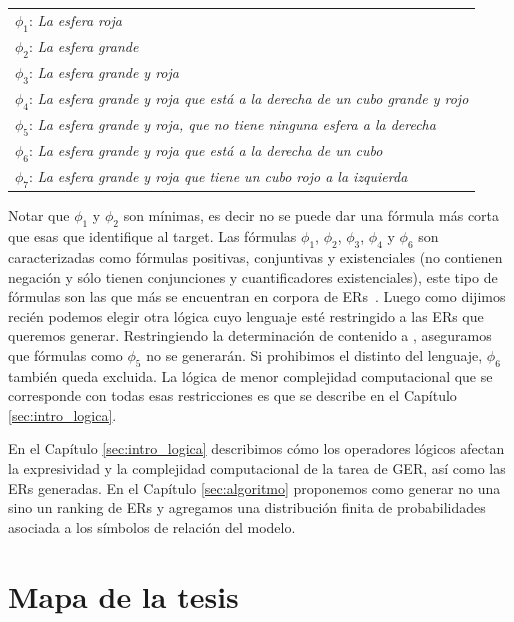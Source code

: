 \begin{tabular}{l}
 $\phi_1$: {\it La esfera roja}\\[1pt]
 $\phi_2$: {\it La esfera grande}\\[1pt]
 $\phi_3$: {\it La esfera grande y roja}\\[1pt]
 $\phi_4$: {\it La esfera grande y roja que est\'a a la derecha de un cubo grande y rojo}\\[1pt]
 $\phi_5$: {\it La esfera grande y roja, que no tiene ninguna esfera a la derecha}\\[1pt]
 $\phi_6$: {\it La esfera grande y roja que est\'a a la derecha de un cubo}\\[1pt]
 $\phi_7$: {\it La esfera grande y roja que tiene un cubo rojo a la izquierda}\\[1pt]
\end{tabular}
\smallskip

Notar que $\phi_1$ y $\phi_2$ son m\'inimas, es decir no se puede dar una f\'ormula m\'as corta que esas que identifique al target.
Las f\'ormulas $\phi_1$, $\phi_2$, $\phi_3$, $\phi_4$ y $\phi_6$ son caracterizadas como f\'ormulas positivas, conjuntivas y existenciales (no contienen negaci\'on y s\'olo tienen conjunciones y cuantificadores existenciales), este tipo de f\'ormulas son las que m\'as se encuentran en corpora de ERs~\cite{viethen06:_algor_for_gener_refer_expres,deemter06:_build_seman_trans_corpus_for,gre3d3}. Luego como dijimos reci\'en podemos elegir otra l\'ogica cuyo lenguaje est\'e restringido a las ERs que queremos generar. Restringiendo la determinaci\'on de contenido a \EPFOL, aseguramos que f\'ormulas como  $\phi_5$ no se generar\'an. Si prohibimos el distinto del lenguaje, $\phi_6$ tambi\'en queda excluida. La l\'ogica de menor complejidad computacional que se corresponde con todas esas restricciones es \EL que se describe en el Cap\'itulo \ref{sec:intro_logica}. 

En el Cap\'itulo \ref{sec:intro_logica} describimos c\'omo los operadores l\'ogicos afectan la expresividad y la complejidad computacional de la tarea de GER, as\'i como las ERs generadas. En el Cap\'itulo \ref{sec:algoritmo} proponemos como generar no una sino un ranking de ERs y agregamos una distribuci\'on finita de probabilidades asociada a los s\'imbolos de relaci\'on del modelo.



\section{Mapa de la tesis}
\label{sec:mapadetesis}

